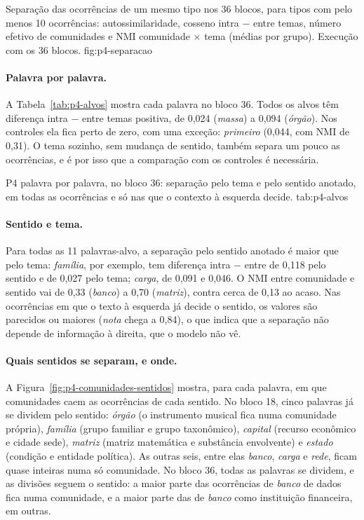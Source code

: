     {Separação das ocorrências de um mesmo tipo nos 36 blocos, para tipos com pelo menos 10
    ocorrências: autossimilaridade, cosseno intra $-$ entre temas, número efetivo de
    comunidades e NMI comunidade $\times$ tema (médias por grupo). Execução com os 36 blocos.}
    {fig:p4-separacao}

\paragraph{Palavra por palavra.} A Tabela~\ref{tab:p4-alvos} mostra cada palavra no bloco 36.
Todos os alvos têm diferença intra $-$ entre temas positiva, de 0,024 (\emph{massa}) a 0,094
(\emph{órgão}). Nos controles ela fica perto de zero, com uma exceção: \emph{primeiro} (0,044,
com NMI de 0,31). O tema sozinho, sem mudança de sentido, também separa um pouco as
ocorrências, e é por isso que a comparação com os controles é necessária.

    {P4 palavra por palavra, no bloco 36: separação pelo tema e pelo sentido anotado, em todas
    as ocorrências e só nas que o contexto à esquerda decide.}
    {tab:p4-alvos}

\paragraph{Sentido e tema.} Para todas as 11 palavras-alvo, a separação pelo sentido anotado é
maior que pelo tema: \emph{família}, por exemplo, tem diferença intra $-$ entre de 0,118 pelo
sentido e de 0,027 pelo tema; \emph{carga}, de 0,091 e 0,046. O NMI entre comunidade e sentido
vai de 0,33 (\emph{banco}) a 0,70 (\emph{matriz}), contra cerca de 0,13 ao acaso. Nas
ocorrências em que o texto à esquerda já decide o sentido, os valores são parecidos ou maiores
(\emph{nota} chega a 0,84), o que indica que a separação não depende de informação à direita,
que o modelo não vê.

\paragraph{Quais sentidos se separam, e onde.} A Figura~\ref{fig:p4-comunidades-sentidos}
mostra, para cada palavra, em que comunidades caem as ocorrências de cada sentido. No bloco 18,
cinco palavras já se dividem pelo sentido: \emph{órgão} (o instrumento musical fica numa
comunidade própria), \emph{família} (grupo familiar e grupo taxonômico), \emph{capital}
(recurso econômico e cidade sede), \emph{matriz} (matriz matemática e substância envolvente) e
\emph{estado} (condição e entidade política). As outras seis, entre elas \emph{banco},
\emph{carga} e \emph{rede}, ficam quase inteiras numa só comunidade. No bloco 36, todas as
palavras se dividem, e as divisões seguem o sentido: a maior parte das ocorrências de
\emph{banco} de dados fica numa comunidade, e a maior parte das de \emph{banco} como
instituição financeira, em outras.

